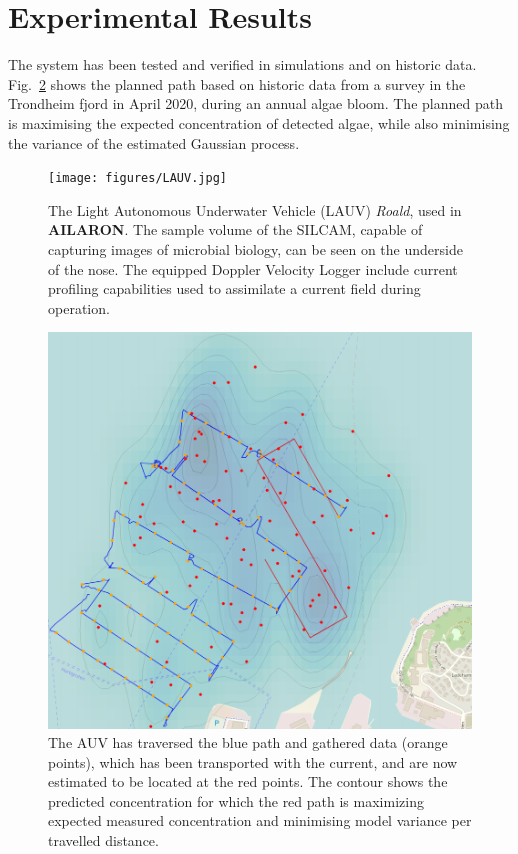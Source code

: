 \documentclass[conference]{IEEEtran}
\def\proje{{\textbf{AILARON}}}
\begin{document}
\section{Experimental Results}

The system has been tested and verified in simulations and on historic
data. Fig.~\ref{fig:munkholmen} shows the planned path based on historic
data from a survey in the Trondheim fjord in April 2020, during an
annual algae bloom. The planned path is maximising the expected
concentration of detected algae, while also minimising the variance of
the estimated Gaussian process.

\begin{figure}[tbp]
  \centering
  \texttt{[image: figures/LAUV.jpg]}
  \caption{The Light Autonomous Underwater Vehicle (LAUV)
    \emph{Roald}, used in \proje. The sample volume of the SILCAM,
    capable of capturing images of microbial biology, can be seen on
    the underside of the nose. The equipped Doppler Velocity Logger
    include current profiling capabilities used to assimilate a
    current field during operation.}
  \label{fig:roald}
\end{figure}

\begin{figure}[tbp]
  \centering
  \includegraphics[width=\linewidth]{figures/munkholmen_planned_path.png}
  \caption{The AUV has traversed the blue path and gathered data (orange
    points), which has been transported with the current, and are now
    estimated to be located at the red points.  The contour shows the
    predicted concentration for which the red path is maximizing
    expected measured concentration and minimising model variance per travelled distance.}
  \label{fig:munkholmen}
\end{figure}





\end{document}
